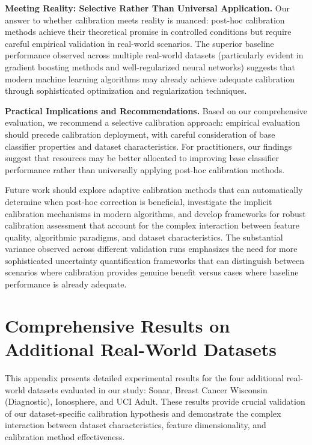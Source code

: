 \documentclass[12pt, a4paper]{article}
\begin{document}
\textbf{Meeting Reality: Selective Rather Than Universal Application.} Our answer to whether calibration meets reality is nuanced: post-hoc calibration methods achieve their theoretical promise in controlled conditions but require careful empirical validation in real-world scenarios. The superior baseline performance observed across multiple real-world datasets (particularly evident in gradient boosting methods and well-regularized neural networks) suggests that modern machine learning algorithms may already achieve adequate calibration through sophisticated optimization and regularization techniques.

\textbf{Practical Implications and Recommendations.} Based on our comprehensive evaluation, we recommend a selective calibration approach: empirical evaluation should precede calibration deployment, with careful consideration of base classifier properties and dataset characteristics. For practitioners, our findings suggest that resources may be better allocated to improving base classifier performance rather than universally applying post-hoc calibration methods.

Future work should explore adaptive calibration methods that can automatically determine when post-hoc correction is beneficial, investigate the implicit calibration mechanisms in modern algorithms, and develop frameworks for robust calibration assessment that account for the complex interaction between feature quality, algorithmic paradigms, and dataset characteristics. The substantial variance observed across different validation runs emphasizes the need for more sophisticated uncertainty quantification frameworks that can distinguish between scenarios where calibration provides genuine benefit versus cases where baseline performance is already adequate.

\appendix
\section{Comprehensive Results on Additional Real-World Datasets}\label{sec:AdditionalExperiments}

This appendix presents detailed experimental results for the four additional real-world datasets evaluated in our study: Sonar, Breast Cancer Wisconsin (Diagnostic), Ionosphere, and UCI Adult. These results provide crucial validation of our dataset-specific calibration hypothesis and demonstrate the complex interaction between dataset characteristics, feature dimensionality, and calibration method effectiveness.
\end{document}
